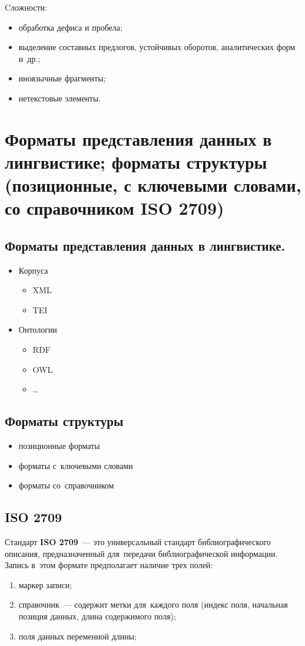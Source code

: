 \documentclass[12pt]{article}
\theoremstyle{definition}
\theoremstyle{remark}
\numberwithin{equation}{section}
\begin{document}
Cложности:
\begin{itemize}
    \item обработка дефиса и пробела;
    \item выделение составных предлогов, устойчивых оборотов, аналитических форм и~др.;
    \item иноязычные фрагменты;
    \item нетекстовые элементы.
\end{itemize}

\section{Форматы представления данных в лингвистике; форматы структуры (позиционные, с ключевыми словами, со справочником ISO 2709)}
\subsection{Форматы представления данных в лингвистике.}
\begin{itemize}
    \item Корпуса
    \begin{itemize}
        \item XML
        \item TEI
    \end{itemize}
    \item Онтологии
    \begin{itemize}
        \item RDF
        \item OWL
        \item \dots
    \end{itemize}
\end{itemize}

\subsection{Форматы структуры}
\begin{itemize}
    \item позиционные форматы
    \item форматы с~ключевыми словами
    \item форматы со~справочником
\end{itemize}

\subsection{ISO 2709}
\label{subsec:ISO}
Стандарт \textbf{ISO 2709}~--- это универсальный стандарт
библиографического описания, предназначенный для~передачи
библиографической информации. Запись в~этом формате предполагает
наличие трех полей:
\begin{enumerate}
    \item маркер записи;
    \item справочник~--- содержит метки для~каждого поля
    (индекс поля, начальная позиция данных, длина содержимого поля);
    \item поля данных переменной длины;
\end{enumerate}
\end{document}
